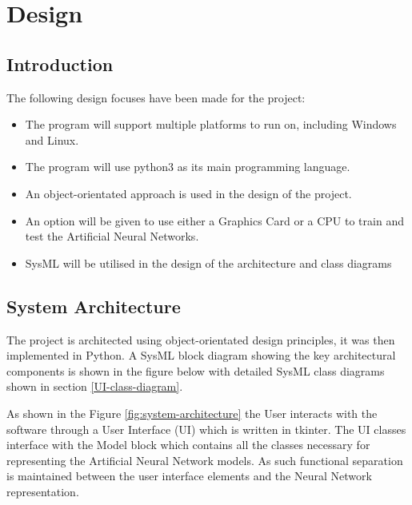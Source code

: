 \documentclass[./project-report/src/latex/project-report.tex]{subfiles}
\begin{document}
\maketitle

\clearpage
\section{Design}

\subsection{Introduction}

The following design focuses have been made for the project:

\begin{itemize}
    \item The program will support multiple platforms to run on, including Windows and Linux.
    \item The program will use python3 as its main programming language.
    \item An object-orientated approach is used in the design of the project.
    \item An option will be given to use either a Graphics Card or a CPU to train and test the Artificial Neural Networks.
    \item SysML will be utilised in the design of the architecture and class diagrams
\end{itemize}

\subsection{System Architecture}

The project is architected using object-orientated design principles, it was then implemented in Python. A SysML block diagram \cite{delligatti2013sysml} showing the key 
architectural components is shown in the figure below with detailed SysML class diagrams shown in section \ref{UI-class-diagram}.

As shown in the Figure \ref{fig:system-architecture} the User interacts with the software through a User Interface (UI) which is written in tkinter. The UI classes interface 
with the Model block which contains all the classes necessary for representing the Artificial Neural Network models. As such functional separation is maintained between the 
user interface elements and the Neural Network representation.
\end{document}
